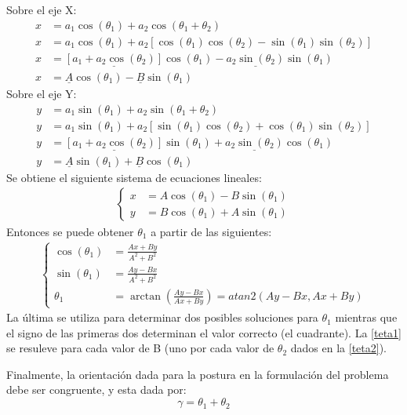 \documentclass[a4paper,12pt]{article}
\begin{document}
Sobre el eje X:
\begin{align*}
    x &= a_1\cos(\theta_1) + a_2\cos(\theta_1 + \theta_2)\\
    x &= a_1\cos(\theta_1) + a_2\left[\cos(\theta_1)\cos(\theta_2) - \sin(\theta_1)\sin(\theta_2)\right]\\
    x &= \underline{\left[a_1 + a_2\cos(\theta_2)\right]}\cos(\theta_1) - \underline{a_2\sin(\theta_2)}\sin(\theta_1)\\
    x &= \underline{A}\cos(\theta_1) - \underline{B}\sin(\theta_1)
\end{align*}
Sobre el eje Y:
\begin{align*}
    y &= a_1\sin(\theta_1) + a_2\sin(\theta_1 + \theta_2)\\
    y &= a_1\sin(\theta_1) + a_2\left[\sin(\theta_1)\cos(\theta_2) + \cos(\theta_1)\sin(\theta_2)\right]\\
    y &= \underline{\left[a_1 + a_2\cos(\theta_2)\right]}\sin(\theta_1) + \underline{a_2\sin(\theta_2)}\cos(\theta_1)\\
    y &= \underline{A}\sin(\theta_1) + \underline{B}\cos(\theta_1)
\end{align*}
Se obtiene el siguiente sistema de ecuaciones lineales:
\begin{align*}
    \begin{cases}
        x &= A\cos(\theta_1) - B\sin(\theta_1)\\
        y &= B\cos(\theta_1) + A\sin(\theta_1)
    \end{cases}
\end{align*}
Entonces se puede obtener $\theta_1$ a partir de las siguientes:
\begin{align}
    \begin{cases}
        \cos(\theta_1) &= \frac{Ax + By}{A^2 + B^2}\\
        \sin(\theta_1) &= \frac{Ay - Bx}{A^2 + B^2}\\
        \theta_1 &= \arctan{\left(\frac{Ay - Bx}{Ax + By}\right) = atan2(Ay-Bx, Ax + By)}
    \end{cases}
    \label{teta1}
\end{align}
La última se utiliza para determinar dos posibles soluciones para $\theta_1$ mientras que el signo de las primeras dos determinan el valor correcto (el cuadrante).
La \cref{teta1} se resuleve para cada valor de B (uno por cada valor de $\theta_2$ dados en la \cref{teta2}).

Finalmente, la orientación dada para la postura en la formulación del problema debe ser congruente, y esta dada por:
\[\gamma = \theta_1 + \theta_2\]
\end{document}
